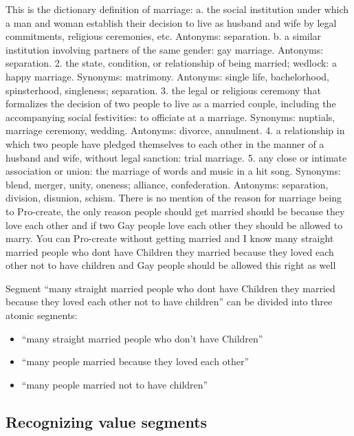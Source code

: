 \begin{mydef}
This is the dictionary definition of marriage:   a.   the social institution
under which a man and woman establish their decision to live as husband and
wife by legal commitments, religious ceremonies, etc. Antonyms: separation.
b.   a similar institution involving partners of the same gender: gay marriage.
Antonyms: separation.   2.   the state, condition, or relationship of being
married; wedlock: a happy marriage. Synonyms: matrimony. Antonyms: single life,
bachelorhood, spinsterhood, singleness; separation.   3.   the legal or
religious ceremony that formalizes the decision of two people to live as a
married couple, including the accompanying social festivities: to officiate at
a marriage. Synonyms: nuptials, marriage ceremony, wedding. Antonyms: divorce,
annulment.   4.   a relationship in which two people have pledged themselves to
each other in the manner of a husband and wife, without legal sanction: trial
marriage.   5.   any close or intimate association or union: the marriage of
words and music in a hit song. Synonyms: blend, merger, unity, oneness;
alliance, confederation. Antonyms: separation, division, disunion, schism.
There is no mention of the reason for marriage being to Pro-create, the only
reason people should get married should be because they love each other and if
two Gay people love each other they should be allowed to marry. You can
Pro-create without getting married and I know many straight married people who
dont have Children they married because they loved each other not to have
children and Gay people should be allowed this right as well
\end{mydef}
Segment ``many straight married people who dont have Children they married
because they loved each other not to have children''
can be divided into three atomic segments:
\begin{itemize}
\item[] ``many straight married people who don't have Children''
\item[] ``many people married because they loved each other''
\item[] ``many people married not to have children''
\end{itemize}

\subsection{Recognizing value segments}

